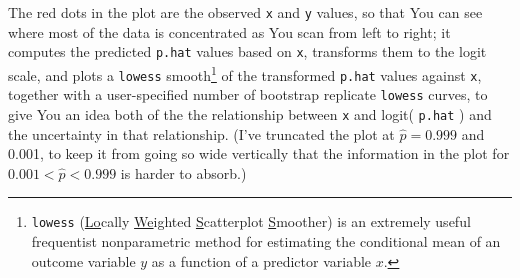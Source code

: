 \documentclass[12pt]{article}
\begin{document}
The red dots in the plot are the observed \texttt{x} and \texttt{y} values, so that You can see where most of the data is concentrated as You scan from left to right; it computes the predicted \texttt{p.hat} values based on \texttt{x}, transforms them to the logit scale, and plots a \texttt{lowess} smooth\footnote{\texttt{lowess} (\underline{Lo}cally \underline{We}ighted \underline{S}catterplot \underline{S}moother) is an extremely useful frequentist nonparametric method for estimating the conditional mean of an outcome variable $y$ as a function of a predictor variable $x$.} of the transformed \texttt{p.hat} values against \texttt{x}, together with a user-specified number of bootstrap replicate \texttt{lowess} curves, to give You an idea both of the the relationship between \texttt{x} and logit( \texttt{p.hat} ) and the uncertainty in that relationship. (I've truncated the plot at $\hat{ p } = 0.999$ and 0.001, to keep it from going so wide vertically that the information in the plot for $0.001 < \hat{ p } < 0.999$ is harder to absorb.)
\end{document}
